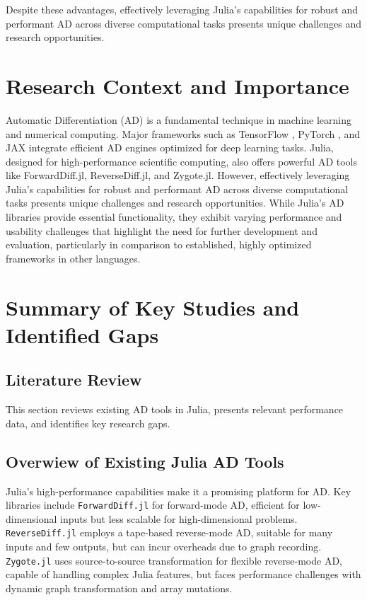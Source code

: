 \documentclass[conference]{IEEEtran}
\begin{document}
Despite these advantages, effectively leveraging Julia's capabilities for robust 
and performant AD across diverse computational tasks presents unique challenges and 
research opportunities.

\section{Research Context and Importance}

Automatic Differentiation (AD) \cite{b6} is a fundamental technique in machine learning and 
numerical computing. Major frameworks such as TensorFlow \cite{b7}, PyTorch \cite{b3}, 
and JAX integrate efficient AD engines optimized for deep learning tasks. Julia, 
designed for high-performance scientific computing, also offers powerful AD tools 
like ForwardDiff.jl, ReverseDiff.jl, and Zygote.jl. However, 
effectively leveraging Julia's capabilities for robust and performant AD across 
diverse computational tasks presents unique challenges and research opportunities. 
While Julia's AD libraries provide essential functionality, 
they exhibit varying performance and usability challenges that highlight the need for 
further development and evaluation, particularly in comparison to established, 
highly optimized frameworks in other languages.

\section{Summary of Key Studies and Identified Gaps}

\subsection{Literature Review}
This section reviews existing AD tools in Julia, presents relevant performance data, 
and identifies key research gaps.

\subsection{Overwiew of Existing Julia AD Tools}
Julia's high-performance capabilities make it a promising platform for AD. Key libraries 
include \texttt{ForwardDiff.jl} for forward-mode AD, efficient for low-dimensional inputs 
but less scalable for high-dimensional problems. \texttt{ReverseDiff.jl} \cite{b8} 
employs a tape-based reverse-mode AD, suitable for many inputs and few outputs, 
but can incur overheads due to graph recording. \texttt{Zygote.jl} \cite{b9} uses source-to-source 
transformation for flexible reverse-mode AD, capable of handling complex Julia features, 
but faces performance challenges with dynamic graph transformation and array mutations.
\end{document}

